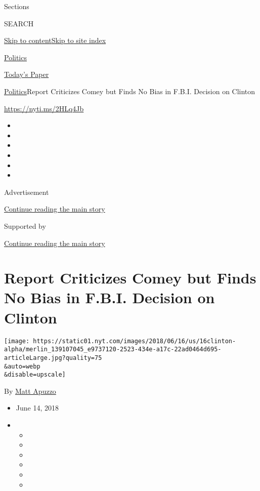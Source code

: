 Sections

SEARCH

\protect\hyperlink{site-content}{Skip to
content}\protect\hyperlink{site-index}{Skip to site index}

\href{https://www.nytimes.com/section/politics}{Politics}

\href{https://myaccount.nytimes.com/auth/login?response_type=cookie\&client_id=vi}{}

\href{https://www.nytimes.com/section/todayspaper}{Today's Paper}

\href{/section/politics}{Politics}\textbar{}Report Criticizes Comey but
Finds No Bias in F.B.I. Decision on Clinton

\url{https://nyti.ms/2HLq4Jb}

\begin{itemize}
\item
\item
\item
\item
\item
\item
\end{itemize}

Advertisement

\protect\hyperlink{after-top}{Continue reading the main story}

Supported by

\protect\hyperlink{after-sponsor}{Continue reading the main story}

\hypertarget{report-criticizes-comey-but-finds-no-bias-in-fbi-decision-on-clinton}{%
\section{Report Criticizes Comey but Finds No Bias in F.B.I. Decision on
Clinton}\label{report-criticizes-comey-but-finds-no-bias-in-fbi-decision-on-clinton}}

\texttt{[image: https://static01.nyt.com/images/2018/06/16/us/16clinton-alpha/merlin\_139107045\_e9737120-2523-434e-a17c-22ad0464d695-articleLarge.jpg?quality=75\\\&auto=webp\\\&disable=upscale]}

By \href{http://www.nytimes.com/by/matt-apuzzo}{Matt Apuzzo}

\begin{itemize}
\item
  June 14, 2018
\item
  \begin{itemize}
  \item
  \item
  \item
  \item
  \item
  \item
  \end{itemize}
\end{itemize}

